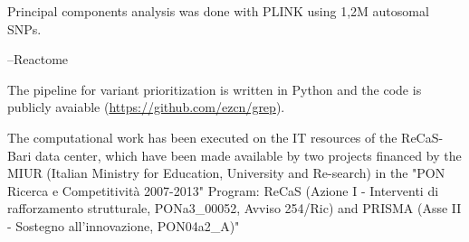 Principal components analysis was done with PLINK\cite{chang2015second} using 1,2M autosomal SNPs. 

--Reactome 


The \gp pipeline for variant prioritization is written in Python and the code is publicly avaiable (\url{https://github.com/ezcn/grep}). 

The computational work has been executed on the IT resources of the ReCaS-Bari data center, which have been made available by two projects financed by the MIUR (Italian Ministry for Education, University and Re-search) in the "PON Ricerca e Competitività 2007-2013" Program: ReCaS (Azione I - Interventi di rafforzamento strutturale, PONa3\_00052, Avviso 254/Ric) and PRISMA (Asse II - Sostegno all'innovazione, PON04a2\_A)"





